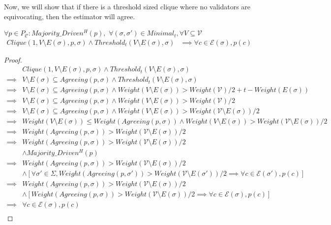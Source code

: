 Now, we will show that if there is a threshold sized clique where no validators are equivocating, then the estimator will agree.

\begin{lemma}
  $\forall p \in P_{\mathcal{C}} : Majority\_Driven^H(p),$ $\forall (\sigma, \sigma') \in Minimal_t, \forall V \subseteq \mathcal{V}$
\begin{align}
Clique(1, V \setminus E(\sigma), p, \sigma) \land Threshold_t(V \setminus E(\sigma), \sigma) &\implies \forall c \in \mathcal{E}(\sigma), p(c)
\end{align}
\end{lemma}

\begin{proof}
  \begin{align}
            &Clique(1, V \setminus E(\sigma), p, \sigma) \land Threshold_t(V \setminus E(\sigma), \sigma) \\
    \implies&V \setminus E(\sigma) \subseteq Agreeing(p, \sigma) \land Threshold_t(V \setminus E(\sigma), \sigma) \\
    \implies&V \setminus E(\sigma) \subseteq Agreeing(p, \sigma) \land Weight(V \setminus E(\sigma)) > Weight(\mathcal{V})/2 + t - Weight(E(\sigma)) \\
    \implies&V \setminus E(\sigma) \subseteq Agreeing(p, \sigma) \land Weight(V \setminus E(\sigma)) > Weight(\mathcal{V})/2 \\
    \implies&V \setminus E(\sigma) \subseteq Agreeing(p, \sigma) \land Weight(V \setminus E(\sigma)) > Weight(\mathcal{V} \setminus E(\sigma))/2 \\
    \implies& Weight(V \setminus E(\sigma)) \leq Weight(Agreeing(p, \sigma)) \land Weight(V \setminus E(\sigma)) > Weight(\mathcal{V} \setminus E(\sigma))/2 \\
    \implies& Weight(Agreeing(p, \sigma)) > Weight(\mathcal{V} \setminus E(\sigma))/2 \\
    \implies& Weight(Agreeing(p, \sigma)) > Weight(\mathcal{V} \setminus E(\sigma))/2 \\
    &\land Majority\_Driven^H(p) \\
    \implies& Weight(Agreeing(p, \sigma)) > Weight(\mathcal{V} \setminus E(\sigma))/2 \\
    &\land [\forall \sigma' \in \Sigma, Weight(Agreeing(p, \sigma')) > Weight(\mathcal{V} \setminus E(\sigma'))/2 \implies \forall c \in \mathcal{E}(\sigma'), p(c)] \\
    \implies& Weight(Agreeing(p, \sigma)) > Weight(\mathcal{V} \setminus E(\sigma))/2 \\
    &\land [Weight(Agreeing(p, \sigma)) > Weight(\mathcal{V} \setminus E(\sigma))/2 \implies \forall c \in \mathcal{E}(\sigma), p(c)] \\
    \implies& \forall c \in \mathcal{E}(\sigma), p(c) \\
  \end{align}
\end{proof}


